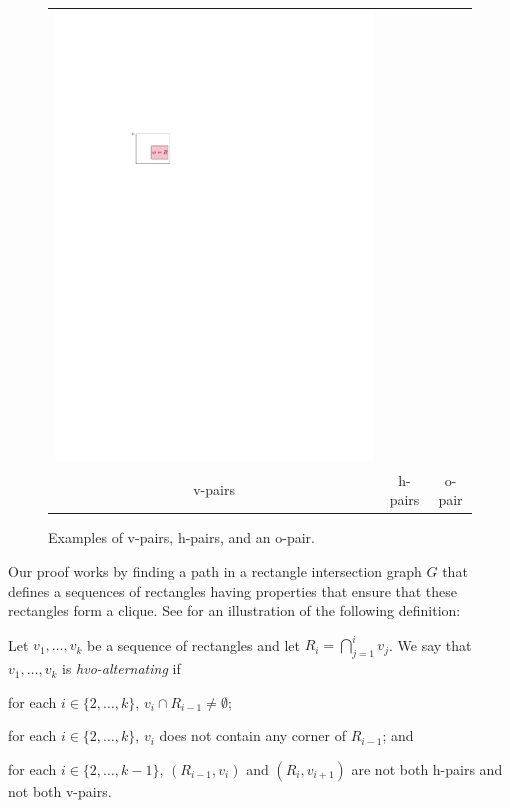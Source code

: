 \documentclass[lotsofwhite]{patmorin}
\begin{document}
\begin{figure}
\begin{tabular}{ccc}
   \includegraphics{figs/hvo-3} \\
   v-pairs & h-pairs & o-pair
   \end{tabular}
   \caption{Examples of v-pairs, h-pairs, and an o-pair.}
\end{figure}

Our proof works by finding a path in a rectangle intersection graph $G$
that defines a sequences of rectangles having properties that ensure
that these rectangles form a clique. See  for an
illustration of the following definition:
\begin{dfn}
Let $v_1,\ldots,v_k$ be a sequence of rectangles and let
$R_i=\bigcap_{j=1}^i v_j$.  We say that $v_1,\ldots,v_k$ is
\emph{hvo-alternating} if
\begin{compactenum}
  \item for each $i\in\{2,\ldots,k\}$, $v_i\cap R_{i-1}\neq \emptyset$;
  \item for each $i\in\{2,\ldots,k\}$,
        $v_i$ does not contain any corner of $R_{i-1}$; and
  \item for each $i\in\{2,\ldots,k-1\}$, $(R_{i-1},v_i)$ and
        $(R_i,v_{i+1})$ are not both h-pairs and not both v-pairs.
\end{compactenum}
\end{dfn}
\end{document}
